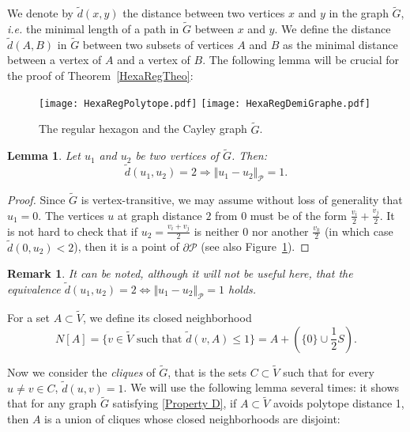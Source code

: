 \documentclass{amsart}                     %
\newtheorem{lemm}{Lemma}
\newtheorem{rema}{Remark}
\newcommand{\tref}[1]{Theorem~\textup{\ref{#1}}}
\newcommand{\fref}[1]{Figure~\textup{\ref{#1}}}
\begin{document}
We denote by $\tilde{d}(x,y)$ the distance between two vertices $x$ and $y$ in the graph $\tilde{G}$, \textit{i.e.} the minimal length of a path in $\tilde{G}$ between $x$ and $y$. We define the distance $\tilde{d}(A,B)$ in $\tilde{G}$ between two subsets of vertices $A$ and $B$ as the minimal distance between a vertex of $A$ and a vertex of $B$. The following lemma will be crucial for the proof of \tref{HexaRegTheo}:


\begin{figure}[!ht]
\texttt{[image: HexaRegPolytope.pdf]}
\hspace{1cm}
\texttt{[image: HexaRegDemiGraphe.pdf]}
\caption{The regular hexagon and the Cayley graph $\tilde{G}$. \label{HexaRegGraph}}
\end{figure}




\begin{lemm}\label{DP1DG2}
Let $u_1$ and $u_2$ be two vertices of $\tilde{G}$. Then: 
\begin{equation}\label{Property D}
\tilde{d}(u_1,u_2)=2 \Rightarrow \Vert  u_1-u_2\Vert  _\mathcal{P}=1. \tag{Property D} 
\end{equation}
\end{lemm}

\begin{proof}
Since $\tilde{G}$ is vertex-transitive, we may assume without loss of generality that $u_1=0$. The vertices $u$ at graph distance $2$ from $0$ must be of the form $\frac{v_i}{2}+\frac{v_j}{2}$. It is not hard to check that if $u_2=\frac{v_i+v_j}{2}$ is neither $0$ nor another $\frac{v_k}{2}$ (in which case $\tilde{d}(0,u_2)<2$), then it is a point of $\partial \mathcal{P}$ (see also \fref{HexaRegGraph}). 
\end{proof}

\begin{rema}
It can be noted, although it will not be useful here, that the equivalence $\tilde{d}(u_1,u_2)=2 \Leftrightarrow \Vert  u_1-u_2\Vert  _\mathcal{P}=1$ holds.
\end{rema}

For a set $A\subset \tilde{V}$, we define its closed neighborhood $$N[A]=\{ v\in \tilde{V} \text{ such that } \tilde{d}(v,A)\leq 1 \}=A+\left(\{0\}\cup \frac{1}{2}S\right).$$

Now we consider the \textit{cliques} of $\tilde{G}$, that is the sets $C\subset \tilde{V}$ such that for every $u\neq v\in C$, $\tilde{d}(u,v)=1$. We will use the following lemma several times: it shows that for any graph $\tilde{G}$ satisfying \eqref{Property D}, if $A\subset \tilde{V}$ avoids polytope distance 1, then $A$ is a union of cliques whose closed neighborhoods are disjoint:
\end{document}
